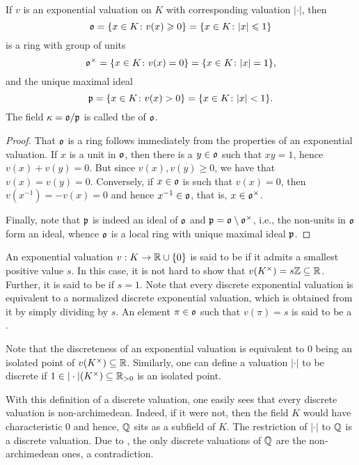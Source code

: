 \begin{proposition}
    If $v$ is an exponential valuation on $K$ with corresponding valuation $|\cdot|$, then 
    \begin{equation*}
        \mathfrak{o} = \{x\in K\colon v(x)\geqslant 0\} = \{x\in K\colon |x|\leqslant 1\}
    \end{equation*}
    is a ring with group of units 
    \begin{equation*}
        \mathfrak{o}^\times = \{x\in K\colon v(x) = 0\} = \{x\in K\colon |x| = 1\},
    \end{equation*}
    and the unique maximal ideal 
    \begin{equation*}
        \mathfrak{p} = \{x\in K\colon v(x) > 0\} = \{x\in K\colon |x| < 1\}.
    \end{equation*}
    The field $\kappa = \mathfrak{o}/\mathfrak{p}$ is called the  of $\mathfrak{o}$.
\end{proposition}
\begin{proof}
    That $\mathfrak{o}$ is a ring follows immediately from the properties of an exponential valuation. If $x$ is a unit in $\mathfrak{o}$, then there is a $y\in\mathfrak{o}$ such that $xy = 1$, hence $v(x) + v(y) = 0$. But since $v(x), v(y)\ge 0$, we have that $v(x) = v(y) = 0$. Conversely, if $x\in\mathfrak{o}$ is such that $v(x) = 0$, then $v(x^{-1}) = -v(x) = 0$ and hence $x^{-1}\in\mathfrak{o}$, that is, $x\in\mathfrak{o}^\times$.

    Finally, note that $\mathfrak{p}$ is indeed an ideal of $\mathfrak{o}$ and $\mathfrak{p} = \mathfrak{o}\setminus\mathfrak{o}^\times$, i.e., the non-units in $\mathfrak{o}$ form an ideal, whence $\mathfrak{o}$ is a local ring with unique maximal ideal $\mathfrak{p}$.
\end{proof}

\begin{definition}
    An exponential valuation $v: K\to\mathbb{R}\cup\{0\}$ is said to be  if it admits a smallest positive value $s$. In this case, it is not hard to show that $v(K^\times) = s\mathbb{Z}\subseteq\mathbb{R}$. Further, it is said to be  if $s = 1$. Note that every discrete exponential valuation is equivalent to a normalized discrete exponential valuation, which is obtained from it by simply dividing by $s$. An element $\pi\in\mathfrak{o}$ such that $v(\pi) = s$ is said to be a .
\end{definition}

\begin{remark}
    Note that the discreteness of an exponential valuation is equivalent to $0$ being an isolated point of $v(K^\times)\subseteq\mathbb{R}$. Similarly, one can define a valuation $|\cdot|$ to be discrete if $1\in |\cdot|(K^\times)\subseteq\mathbb{R}_{> 0}$ is an isolated point.
    
    With this definition of a discrete valuation, one easily sees that every discrete valuation is non-archimedean. Indeed, if it were not, then the field $K$ would have characteristic $0$ and hence, $\mathbb{Q}$ sits as a subfield of $K$. The restriction of $|\cdot|$ to $\mathbb{Q}$ is a discrete valuation. Due to , the only discrete valuations of $\mathbb{Q}$ are the non-archimedean ones, a contradiction.
\end{remark}

